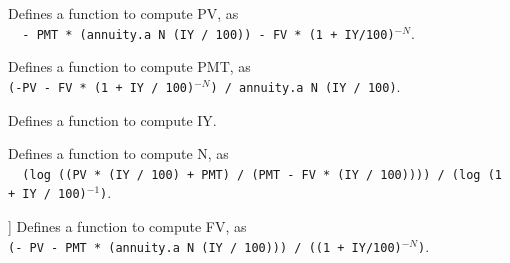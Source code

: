 \begin{definition}\label{CPT_PV}
	\leanok
	Defines a function to compute PV, as\\
	\verb!  - PMT * (annuity.a N (IY / 100)) - FV * (1 + IY/100)!$^{-N}$.
\end{definition}
\begin{definition}\label{CPT_PMT}
	\leanok
	Defines a function to compute PMT, as\\
	\verb!(-PV - FV * (1 + IY / 100)!$^{-N}$\verb!) / annuity.a N (IY / 100)!.
\end{definition}
\begin{definition}\label{CPT_IY}
	\leanok
	Defines a function to compute IY.
\end{definition}
\begin{definition}\label{CPT_N}
	\leanok
	Defines a function to compute N, as\\
	\verb!  (log ((PV * (IY / 100) + PMT) / (PMT - FV * (IY / 100)))) / (log (1 + IY / 100)!$^{-1}$\verb!)!.
\end{definition}
\begin{definition}[[\texttt{CPT\_FV}]]\label{CPT_FV}
	\leanok
	Defines a function to compute FV, as\\
	\verb!(- PV - PMT * (annuity.a N (IY / 100))) / ((1 + IY/100)!$^{-N}$\verb!)!.
\end{definition}

